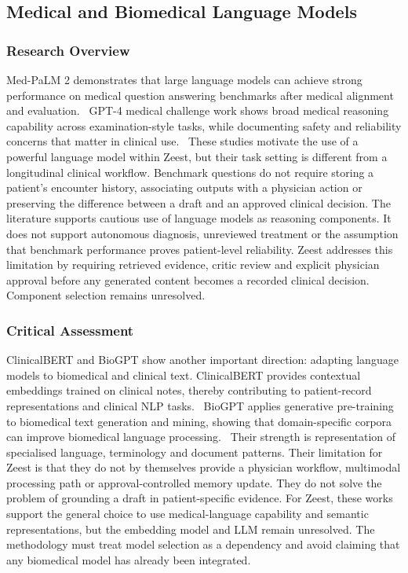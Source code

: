 \subsection{Medical and Biomedical Language Models}
\subsubsection{Research Overview}

Med-PaLM 2 demonstrates that large language models can achieve strong performance on medical question answering benchmarks after medical alignment and evaluation.~\cite{zeestB:medpalm2} GPT-4 medical challenge work shows broad medical reasoning capability across examination-style tasks, while documenting safety and reliability concerns that matter in clinical use.~\cite{zeestA:noriMedical} These studies motivate the use of a powerful language model within Zeest, but their task setting is different from a longitudinal clinical workflow. Benchmark questions do not require storing a patient's encounter history, associating outputs with a physician action or preserving the difference between a draft and an approved clinical decision. The literature supports cautious use of language models as reasoning components. It does not support autonomous diagnosis, unreviewed treatment or the assumption that benchmark performance proves patient-level reliability. Zeest addresses this limitation by requiring retrieved evidence, critic review and explicit physician approval before any generated content becomes a recorded clinical decision. Component selection remains unresolved.

\subsubsection{Critical Assessment}

ClinicalBERT and BioGPT show another important direction: adapting language models to biomedical and clinical text. ClinicalBERT provides contextual embeddings trained on clinical notes, thereby contributing to patient-record representations and clinical NLP tasks.~\cite{zeestB:clinicalbert} BioGPT applies generative pre-training to biomedical text generation and mining, showing that domain-specific corpora can improve biomedical language processing.~\cite{zeestB:biogpt} Their strength is representation of specialised language, terminology and document patterns. Their limitation for Zeest is that they do not by themselves provide a physician workflow, multimodal processing path or approval-controlled memory update. They do not solve the problem of grounding a draft in patient-specific evidence. For Zeest, these works support the general choice to use medical-language capability and semantic representations, but the embedding model and LLM remain unresolved. The methodology must treat model selection as a dependency and avoid claiming that any biomedical model has already been integrated.

